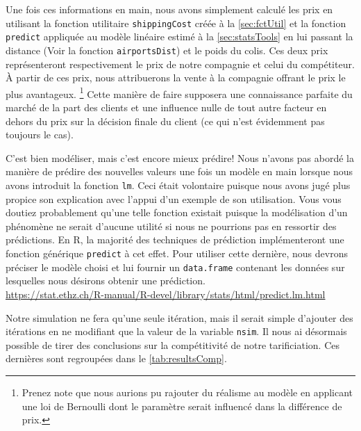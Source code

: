 Une fois ces informations en main, nous avons simplement calculé les prix en utilisant la fonction utilitaire \texttt{shippingCost} créée à la \autoref{sec:fctUtil} et la fonction \texttt{predict} appliquée au modèle linéaire estimé à la \autoref{sec:statsTools} en lui passant la distance (Voir la fonction \texttt{airportsDist}) et le poids du colis. Ces deux prix représenteront respectivement le prix de notre compagnie et celui du compétiteur. À partir de ces prix, nous attribuerons la vente à la compagnie offrant le prix le plus avantageux. \footnote{Prenez note que nous aurions pu rajouter du réalisme au modèle en applicant une loi de Bernoulli dont le paramètre serait influencé dans la différence de prix.} Cette manière de faire supposera une connaissance parfaite du marché de la part des clients et une influence nulle de tout autre facteur en dehors du prix sur la décision finale du client (ce qui n'est évidemment pas toujours le cas). \\

\begin{moreInfo}{C'est bien modéliser, mais c'est encore mieux prédire!}
	Nous n'avons pas abordé la manière de prédire des nouvelles valeurs une fois un modèle en main lorsque nous avons introduit la fonction \texttt{lm}. Ceci était volontaire puisque nous avons jugé plus propice son explication avec l'appui d'un exemple de son utilisation. Vous vous doutiez probablement qu'une telle fonction existait puisque la modélisation d'un phénomène ne serait d'aucune utilité si nous ne pourrions pas en ressortir des prédictions. En R, la majorité des techniques de prédiction implémenteront une fonction générique \texttt{predict} à cet effet. Pour utiliser cette dernière, nous devrons préciser le modèle choisi et lui fournir un \texttt{data.frame} contenant les données sur lesquelles nous désirons obtenir une prédiction. \\
	\url{https://stat.ethz.ch/R-manual/R-devel/library/stats/html/predict.lm.html}
\end{moreInfo}

Notre simulation ne fera qu'une seule itération, mais il serait simple d'ajouter des itérations en ne modifiant que la valeur de la variable \texttt{nsim}. Il nous ai désormais possible de tirer des conclusions sur la compétitivité de notre tarificiation. Ces dernières sont regroupées dans le \autoref{tab:resultsComp}. \\


